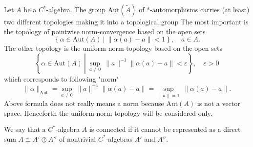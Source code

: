 \documentclass{beamer}
\theoremstyle{plain}
\begin{document}
\begin{frame}
	Let $A$ be a $C^*$-algebra. The group $\mathrm{Aut}\left(\widetilde{A}\right)$ of *-automorphisms carries (at least) two different topologies making it into a topological group  The most important is \alert{the topology of pointwise norm-convergence} based on the open sets
\begin{equation*}
	\left\{\left.\alpha \in \mathrm{Aut}(A) \ \right| \ \|\alpha(a)-a\| < 1 \right\}, \quad a \in A.
\end{equation*}
The other topology is the \alert{uniform norm-topology} based on the open sets
\begin{equation}\label{aut_norm_eqn}
	\left\{\alpha \in \mathrm{Aut}(A) \ \left| \ \sup_{a \neq 0}\ \|a\|^{-1} \|\alpha(a)-a\| < \varepsilon \right. \right\}, \quad \varepsilon > 0
\end{equation}
which corresponds to following "norm"
\begin{equation}\label{uniform_norm_topology_formula_eqn}
	\|\alpha\|_{\text{Aut}} = \sup_{a \neq 0}\ \|a\|^{-1} \|\alpha(a)-a\| = \sup_{\|a\| =1}\  \|\alpha(a)-a\|.
\end{equation}
Above formula does not really means a norm because $\mathrm{Aut}\left(A\right)$ is not a vector space. Henceforth the uniform norm-topology will be considered only.
\end{frame}
\begin{frame}

  \begin{definition}\label{connected_c_a_defn}
	We say that a $C^*$-algebra $A$ is \alert{connected} if it cannot be represented as a direct sum  $A \cong A' \oplus A''$ of nontrivial $C^*$-algebras $A'$ and $A''$.
	
\end{definition}
\end{frame}
\end{document}
